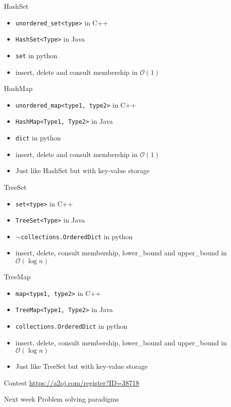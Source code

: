 \documentclass{beamer}
\begin{document}
\begin{frame}{HashSet}
  \begin{itemize}
  \item \texttt{unordered\_set<type>} in C++
  \item \texttt{HashSet<Type>} in Java
  \item \texttt{set} in python
  \item insert, delete and consult membership in $\mathcal{O}(1)$ 
  \end{itemize}
\end{frame}

\begin{frame}{HashMap}
  \begin{itemize}
  \item \texttt{unordered\_map<type1, type2>} in C++
  \item \texttt{HashMap<Type1, Type2>} in Java
  \item \texttt{dict} in python
  \item insert, delete and consult membership in $\mathcal{O}(1)$
  \item Just like HashSet but with key-value storage 
  \end{itemize}
\end{frame}

\begin{frame}{TreeSet}
  \begin{itemize}
  \item \texttt{set<type>} in C++
  \item \texttt{TreeSet<Type>} in Java
  \item $\sim$\texttt{collections.OrderedDict} in python
  \item insert, delete, consult membership, lower\_bound and upper\_bound in $\mathcal{O}(\log{n})$ 
  \end{itemize}
\end{frame}

\begin{frame}{TreeMap}
  \begin{itemize}
  \item \texttt{map<type1, type2>} in C++
  \item \texttt{TreeMap<Type1, Type2>} in Java
  \item \texttt{collections.OrderedDict} in python
  \item insert, delete, consult membership, lower\_bound and upper\_bound in $\mathcal{O}(\log{n})$ 
  \item Just like TreeSet but with key-value storage 
  \end{itemize}
\end{frame}

\begin{frame}{Contest}
  \href{https://a2oj.com/register?ID=38718}{https://a2oj.com/register?ID=38718}
\end{frame}

\begin{frame}{Next week}
  \centering 
  \Large
  Problem solving paradigms
\end{frame}
\end{document}
